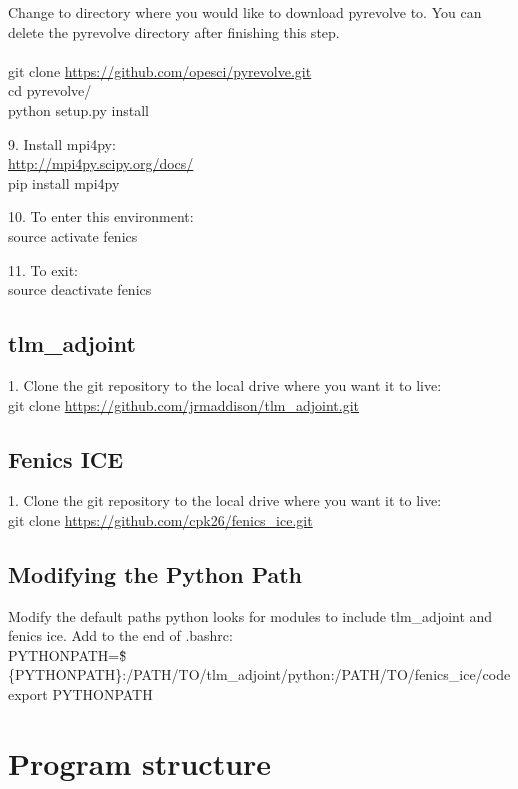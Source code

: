 \documentclass[11pt, reqno, nocenter]{article}
\begin{document}
Change to directory where you would like to download pyrevolve to. You can delete the pyrevolve directory after finishing this step. \\ \\
git clone \url{https://github.com/opesci/pyrevolve.git} \\
cd pyrevolve/ \\
python setup.py install

9. Install mpi4py: \\
\url{http://mpi4py.scipy.org/docs/} \\
pip install mpi4py

10. To enter this environment: \\
source activate fenics

11. To exit: \\
source deactivate fenics

\subsection{tlm\_adjoint}

1. Clone the git repository to the local drive where you want it to live:\\
git clone \url{https://github.com/jrmaddison/tlm_adjoint.git}

\subsection{Fenics ICE}

1. Clone the git repository to the local drive where you want it to live: \\
git clone \url{https://github.com/cpk26/fenics_ice.git}

\subsection{Modifying the Python Path}

Modify the default paths python looks for modules to include tlm\_adjoint and fenics ice. Add to the end of .bashrc: \\
PYTHONPATH=\"\$\{PYTHONPATH\}:/PATH/TO/tlm\_adjoint/python:/PATH/TO/fenics\_ice/code\" \\
export PYTHONPATH

\section{Program structure}
\end{document}
